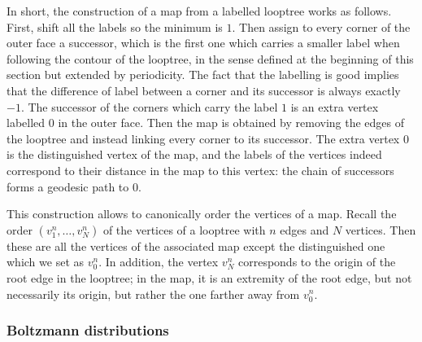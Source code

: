 \documentclass[british, a4paper,11pt]{article}
\numberwithin{equation}{section}
\theoremstyle{definition}
\begin{document}
In short, the construction of a map from a labelled looptree works as follows. First, shift all the labels so the minimum is $1$. Then assign to every corner of the outer face a successor, which is the first one which carries a smaller label when following the contour of the looptree, in the sense defined at the beginning of this section but extended by periodicity. The fact that the labelling is good implies that the difference of label between a corner and its successor is always exactly $-1$. The successor of the corners which carry the label $1$ is an extra vertex labelled $0$ in the outer face. Then the map is obtained by removing the edges of the looptree and instead linking every corner to its successor.
The extra vertex $0$ is the distinguished vertex of the map, and the labels of the vertices indeed correspond to their distance in the map to this vertex: the chain of successors forms a geodesic path to $0$.

This construction allows to canonically order the vertices of a map. Recall the order $(v^n_1, \dots, v^n_N)$ of the vertices of a looptree with $n$ edges and $N$ vertices. Then these are all the vertices of the associated map except the distinguished one which we set as $v^n_0$.
In addition, the vertex $v^n_N$ corresponds to the origin of the root edge in the looptree; in the map, it is an extremity of the root edge, but not necessarily its origin, but rather the one farther away from $v_0^n$. 


\subsubsection*{Boltzmann distributions}
\end{document}

